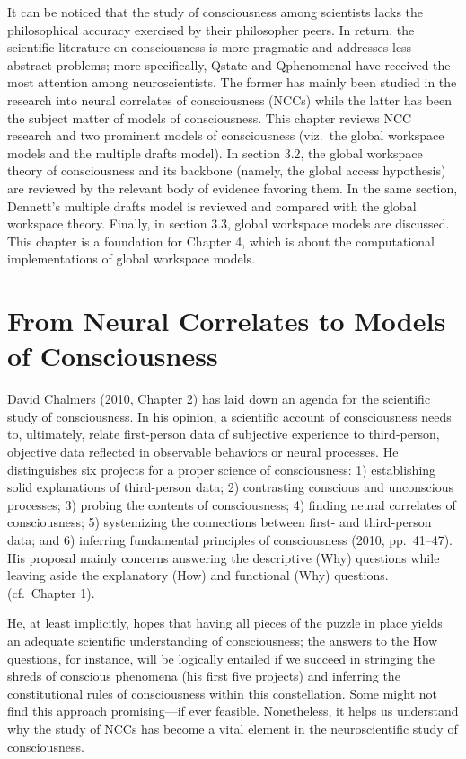 \documentclass[12pt,twoside]{reedthesis}
\begin{document}
It can be noticed that the study of consciousness among scientists lacks the philosophical accuracy exercised by their philosopher peers. In return, the scientific literature on consciousness is more pragmatic and addresses less abstract problems; more specifically, Qstate and Qphenomenal have received the most attention among neuroscientists. The former has mainly been studied in the research into neural correlates of consciousness (NCCs) while the latter has been the subject matter of models of consciousness. This chapter reviews NCC research and two prominent models of consciousness (viz.~the global workspace models and the multiple drafts model). In section 3.2, the global workspace theory of consciousness and its backbone (namely, the global access hypothesis) are reviewed by the relevant body of evidence favoring them. In the same section, Dennett's multiple drafts model is reviewed and compared with the global workspace theory. Finally, in section 3.3, global workspace models are discussed. This chapter is a foundation for Chapter 4, which is about the computational implementations of global workspace models.

\hypertarget{from-neural-correlates-to-models-of-consciousness}{%
\section{From Neural Correlates to Models of Consciousness}\label{from-neural-correlates-to-models-of-consciousness}}

David Chalmers (2010, Chapter 2) has laid down an agenda for the scientific study of consciousness. In his opinion, a scientific account of consciousness needs to, ultimately, relate first-person data of subjective experience to third-person, objective data reflected in observable behaviors or neural processes. He distinguishes six projects for a proper science of consciousness: 1) establishing solid explanations of third-person data; 2) contrasting conscious and unconscious processes; 3) probing the contents of consciousness; 4) finding neural correlates of consciousness; 5) systemizing the connections between first- and third-person data; and 6) inferring fundamental principles of consciousness (2010, pp.~41--47). His proposal mainly concerns answering the descriptive (Why) questions while leaving aside the explanatory (How) and functional (Why) questions. (cf.~Chapter 1).

He, at least implicitly, hopes that having all pieces of the puzzle in place yields an adequate scientific understanding of consciousness; the answers to the How questions, for instance, will be logically entailed if we succeed in stringing the shreds of conscious phenomena (his first five projects) and inferring the constitutional rules of consciousness within this constellation. Some might not find this approach promising---if ever feasible. Nonetheless, it helps us understand why the study of NCCs has become a vital element in the neuroscientific study of consciousness.
\end{document}

